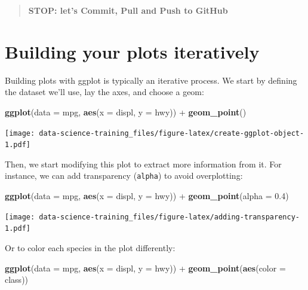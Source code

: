 \documentclass[]{book}
\newenvironment{Shaded}{\begin{snugshade}}{\end{snugshade}}
\newcommand{\KeywordTok}[1]{\textcolor[rgb]{0.13,0.29,0.53}{\textbf{{#1}}}}
\newcommand{\DataTypeTok}[1]{\textcolor[rgb]{0.13,0.29,0.53}{{#1}}}
\newcommand{\FloatTok}[1]{\textcolor[rgb]{0.00,0.00,0.81}{{#1}}}
\newcommand{\StringTok}[1]{\textcolor[rgb]{0.31,0.60,0.02}{{#1}}}
\newcommand{\NormalTok}[1]{{#1}}
\theoremstyle{definition}
\theoremstyle{definition}
\theoremstyle{definition}
\theoremstyle{remark}
\begin{document}
\begin{quote}
\textbf{STOP: let's Commit, Pull and Push to GitHub}
\end{quote}

\section{Building your plots
iteratively}\label{building-your-plots-iteratively}

Building plots with ggplot is typically an iterative process. We start
by defining the dataset we'll use, lay the axes, and choose a geom:

\begin{Shaded}
\begin{Highlighting}[]
\KeywordTok{ggplot}\NormalTok{(}\DataTypeTok{data =} \NormalTok{mpg, }\KeywordTok{aes}\NormalTok{(}\DataTypeTok{x =} \NormalTok{displ, }\DataTypeTok{y =} \NormalTok{hwy)) +}
\StringTok{    }\KeywordTok{geom_point}\NormalTok{()}
\end{Highlighting}
\end{Shaded}

\texttt{[image: data-science-training\_files/figure-latex/create-ggplot-object-1.pdf]}

Then, we start modifying this plot to extract more information from it.
For instance, we can add transparency (\texttt{alpha}) to avoid
overplotting:

\begin{Shaded}
\begin{Highlighting}[]
\KeywordTok{ggplot}\NormalTok{(}\DataTypeTok{data =} \NormalTok{mpg, }\KeywordTok{aes}\NormalTok{(}\DataTypeTok{x =} \NormalTok{displ, }\DataTypeTok{y =} \NormalTok{hwy)) +}
\StringTok{    }\KeywordTok{geom_point}\NormalTok{(}\DataTypeTok{alpha =} \FloatTok{0.4}\NormalTok{)}
\end{Highlighting}
\end{Shaded}

\texttt{[image: data-science-training\_files/figure-latex/adding-transparency-1.pdf]}

Or to color each species in the plot differently:

\begin{Shaded}
\begin{Highlighting}[]
\KeywordTok{ggplot}\NormalTok{(}\DataTypeTok{data =} \NormalTok{mpg, }\KeywordTok{aes}\NormalTok{(}\DataTypeTok{x =} \NormalTok{displ, }\DataTypeTok{y =} \NormalTok{hwy)) +}
\StringTok{    }\KeywordTok{geom_point}\NormalTok{(}\KeywordTok{aes}\NormalTok{(}\DataTypeTok{color =} \NormalTok{class))}
\end{Highlighting}
\end{Shaded}
\end{document}
